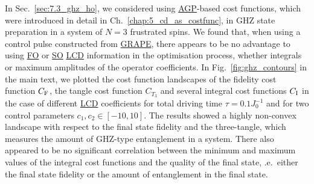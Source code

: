 \documentclass[a4paper,oneside,11pt]{book}
\newcommand{\acrref}[1]{\hyperref[acr:#1]{#1}}
\begin{document}
In Sec.~\ref{sec:7.3_ghz_ho}, we considered using \acrref{AGP}-based cost functions, which were introduced in detail in Ch.~\ref{chap:5_cd_as_costfunc}, in GHZ state preparation in a system of $N=3$ frustrated spins. We found that, when using a control pulse constructed from \acrref{GRAPE}, there appears to be no advantage to using \acrref{FO} or \acrref{SO} \acrref{LCD} information in the optimisation process, whether integrals or maximum amplitudes of the operator coefficients. In Fig.~\ref{fig:ghz_contours} in the main text, we plotted the cost function landscapes of the fidelity cost function $C_{\rm F}$, the tangle cost function $C_{T_3}$ and several integral cost functions $C_{\rm I}$ in the case of different \acrref{LCD} coefficients for total driving time $\tau = 0.1J_0^{-1}$ and for two control parameters $c_1, c_2 \in [-10,10]$. The results showed a highly non-convex landscape with respect to the final state fidelity and the three-tangle, which measures the amount of GHZ-type entanglement in a system. There also appeared to be no significant correlation between the minimum and maximum values of the integral cost functions and the quality of the final state, \@i.e.~either the final state fidelity or the amount of entanglement in the final state. 
\end{document}
